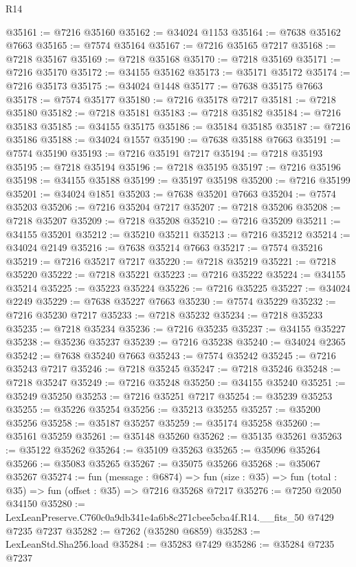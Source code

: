 \begin{lexlean}{R14}
\begin{coremodule}
@35161 := @7216 @35160
@35162 := @34024 @1153
@35164 := @7638 @35162 @7663
@35165 := @7574 @35164
@35167 := @7216 @35165 @7217
@35168 := @7218 @35167
@35169 := @7218 @35168
@35170 := @7218 @35169
@35171 := @7216 @35170
@35172 := @34155 @35162
@35173 := @35171 @35172
@35174 := @7216 @35173
@35175 := @34024 @1448
@35177 := @7638 @35175 @7663
@35178 := @7574 @35177
@35180 := @7216 @35178 @7217
@35181 := @7218 @35180
@35182 := @7218 @35181
@35183 := @7218 @35182
@35184 := @7216 @35183
@35185 := @34155 @35175
@35186 := @35184 @35185
@35187 := @7216 @35186
@35188 := @34024 @1557
@35190 := @7638 @35188 @7663
@35191 := @7574 @35190
@35193 := @7216 @35191 @7217
@35194 := @7218 @35193
@35195 := @7218 @35194
@35196 := @7218 @35195
@35197 := @7216 @35196
@35198 := @34155 @35188
@35199 := @35197 @35198
@35200 := @7216 @35199
@35201 := @34024 @1851
@35203 := @7638 @35201 @7663
@35204 := @7574 @35203
@35206 := @7216 @35204 @7217
@35207 := @7218 @35206
@35208 := @7218 @35207
@35209 := @7218 @35208
@35210 := @7216 @35209
@35211 := @34155 @35201
@35212 := @35210 @35211
@35213 := @7216 @35212
@35214 := @34024 @2149
@35216 := @7638 @35214 @7663
@35217 := @7574 @35216
@35219 := @7216 @35217 @7217
@35220 := @7218 @35219
@35221 := @7218 @35220
@35222 := @7218 @35221
@35223 := @7216 @35222
@35224 := @34155 @35214
@35225 := @35223 @35224
@35226 := @7216 @35225
@35227 := @34024 @2249
@35229 := @7638 @35227 @7663
@35230 := @7574 @35229
@35232 := @7216 @35230 @7217
@35233 := @7218 @35232
@35234 := @7218 @35233
@35235 := @7218 @35234
@35236 := @7216 @35235
@35237 := @34155 @35227
@35238 := @35236 @35237
@35239 := @7216 @35238
@35240 := @34024 @2365
@35242 := @7638 @35240 @7663
@35243 := @7574 @35242
@35245 := @7216 @35243 @7217
@35246 := @7218 @35245
@35247 := @7218 @35246
@35248 := @7218 @35247
@35249 := @7216 @35248
@35250 := @34155 @35240
@35251 := @35249 @35250
@35253 := @7216 @35251 @7217
@35254 := @35239 @35253
@35255 := @35226 @35254
@35256 := @35213 @35255
@35257 := @35200 @35256
@35258 := @35187 @35257
@35259 := @35174 @35258
@35260 := @35161 @35259
@35261 := @35148 @35260
@35262 := @35135 @35261
@35263 := @35122 @35262
@35264 := @35109 @35263
@35265 := @35096 @35264
@35266 := @35083 @35265
@35267 := @35075 @35266
@35268 := @35067 @35267
@35274 := fun (message : @6874) =>
  fun (size : @35) => fun (total : @35) => fun (offset : @35) => @7216 @35268 @7217
@35276 := @7250 @2050 @34150
@35280 := LexLeanPreserve.C760c0a9db341e4a6b8c271cbee5cba4f.R14.__fits_50 @7429 @7235 @7237
@35282 := @7262 (@35280 @6859)
@35283 := LexLeanStd.Sha256.load
@35284 := @35283 @7429
@35286 := @35284 @7235 @7237

\end{coremodule}
\end{lexlean}
